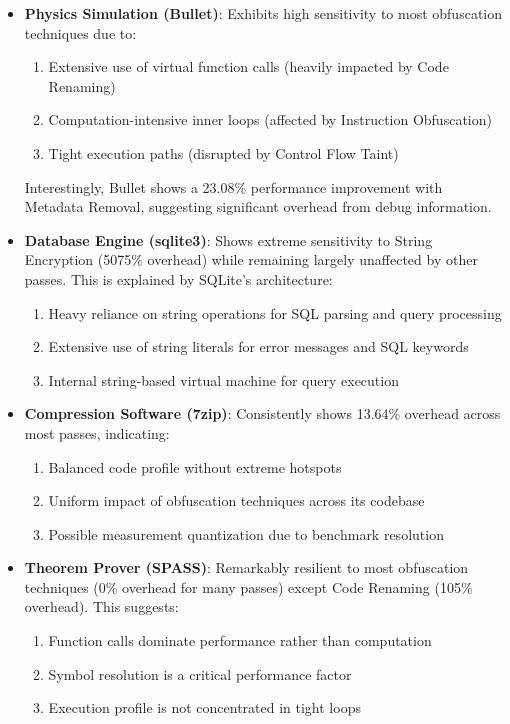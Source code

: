 \documentclass[conference]{IEEEtran}
\begin{document}
\begin{itemize}
    \item \textbf{Physics Simulation (Bullet)}: Exhibits high sensitivity to most obfuscation techniques due to:
    \begin{enumerate}
        \item Extensive use of virtual function calls (heavily impacted by Code Renaming)
        \item Computation-intensive inner loops (affected by Instruction Obfuscation)
        \item Tight execution paths (disrupted by Control Flow Taint)
    \end{enumerate}
    Interestingly, Bullet shows a 23.08\% performance improvement with Metadata Removal, suggesting significant overhead from debug information.
    
    \item \textbf{Database Engine (sqlite3)}: Shows extreme sensitivity to String Encryption (5075\% overhead) while remaining largely unaffected by other passes. This is explained by SQLite's architecture:
    \begin{enumerate}
        \item Heavy reliance on string operations for SQL parsing and query processing
        \item Extensive use of string literals for error messages and SQL keywords
        \item Internal string-based virtual machine for query execution
    \end{enumerate}
    
    \item \textbf{Compression Software (7zip)}: Consistently shows 13.64\% overhead across most passes, indicating:
    \begin{enumerate}
        \item Balanced code profile without extreme hotspots
        \item Uniform impact of obfuscation techniques across its codebase
        \item Possible measurement quantization due to benchmark resolution
    \end{enumerate}
    
    \item \textbf{Theorem Prover (SPASS)}: Remarkably resilient to most obfuscation techniques (0\% overhead for many passes) except Code Renaming (105\% overhead). This suggests:
    \begin{enumerate}
        \item Function calls dominate performance rather than computation
        \item Symbol resolution is a critical performance factor
        \item Execution profile is not concentrated in tight loops
    \end{enumerate}
\end{itemize}
\end{document}
